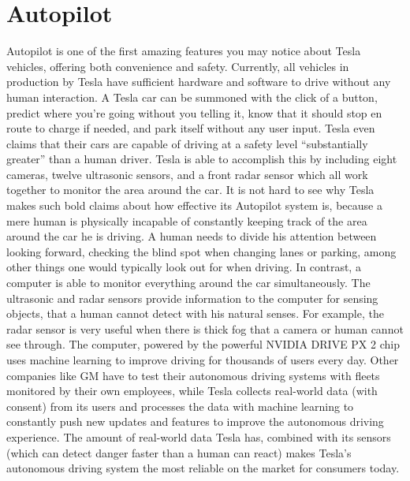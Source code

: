 \documentclass{article}
\begin{document}
  \section{Autopilot}
  Autopilot is one of the first amazing features you may notice about Tesla vehicles,
  offering both convenience and safety. Currently, all vehicles in production by Tesla
  have sufficient hardware and software to drive without any human interaction.
  A Tesla car can be summoned with the click of a button, predict where you're
  going without you telling it, know that it should stop en route to charge if needed,
  and park itself without any user input. Tesla even claims that their cars are capable of driving
  at a safety level ``substantially greater'' than a human driver\cite{allcarsautopilot}.
  Tesla is able to accomplish this by including eight cameras, twelve ultrasonic sensors, and a front radar
  sensor which all work together to monitor the area around the car. It is not hard
  to see why Tesla makes such bold claims about how effective its Autopilot system is,
  because a mere human is physically incapable of constantly keeping track of the area around
  the car he is driving. A human needs to divide his attention between looking forward,
  checking the blind spot when changing lanes or parking, among other things one would typically
  look out for when driving. In contrast, a computer is able to monitor everything
  around the car simultaneously. The ultrasonic and radar sensors
  provide information to the computer for sensing objects, that a human cannot
  detect with his natural senses. For example, the radar sensor is very useful when
  there is thick fog that a camera or human cannot see through. The computer, powered
  by the powerful NVIDIA DRIVE PX 2 chip uses machine learning to improve driving for
  thousands of users every day. Other companies like GM have to test their autonomous
  driving systems with fleets monitored by their own employees, while Tesla collects
  real-world data (with consent) from its users and processes the data with machine
  learning to constantly push new updates and features to improve the autonomous
  driving experience.
  \cite{tdata1}\cite{tdata2}\cite{tdata3}
  The amount of real-world data Tesla has, combined with its sensors (which can
  detect danger faster than a human can react\cite{predictcrash}) makes Tesla's
  autonomous driving system the most reliable on the market for consumers today.

\end{document}
